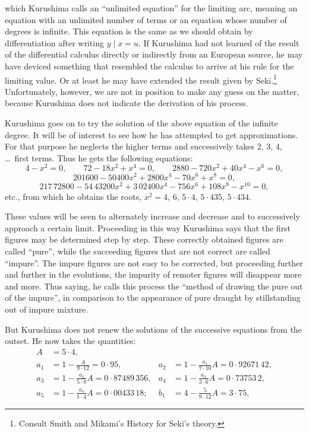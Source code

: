 \documentclass[11pt]{article}
\newcommand{\scanpage}[2]{\clearpage\setcounter{footnote}{0}\noindent{\footnotesize\color{gray}PDF page #1 · #2}\par\medskip}
\newcommand{\scanfooter}{}
\newcommand{\dd}{\mathbin{\cdot}}
\begin{document}
\scanpage{0234}{Chapter 30, printed page 220}
which Kurushima calls an ``unlimited equation'' for the limiting arc, meaning an equation with an unlimited number of terms or an equation whose number of degrees is infinite. This equation is the same as we should obtain by differentiation after writing $y\mid x=u$. If Kurushima had not learned of the result of the differential calculus directly or indirectly from an European source, he may have deviced something that resembled the calculus to arrive at his rule for the limiting value. Or at least he may have extended the result given by Seki.\footnote{Consult Smith and Mikami's History for Seki's theory.} Unfortunately, however, we are not in position to make any guess on the matter, because Kurushima does not indicate the derivation of his process.

Kurushima goes on to try the solution of the above equation of the infinite degree. It will be of interest to see how he has attempted to get approximations. For that purpose he neglects the higher terms and successively takes 2, 3, 4, \ldots\ first terms. Thus he gets the following equations:
\[
4-x^2=0,
\qquad 72-18x^2+x^4=0,
\qquad 2880-720x^2+40x^4-x^6=0,
\]
\[
201600-50400x^2+2800x^4-70x^6+x^8=0,
\]
\[
217\,72800-54\,43200x^2+3\,02400x^4-756x^6+108x^8-x^{10}=0,
\]
etc., from which he obtains the roots, $x^2=4$, $6$, $5\dd4$, $5\dd435$, $5\dd434$.

These values will be seen to alternately increase and decrease and to successively approach a certain limit. Proceeding in this way Kurushima says that the first figures may be determined step by step. These correctly obtained figures are called ``pure'', while the succeeding figures that are not correct are called ``impure''. The impure figures are not easy to be corrected, but proceeding further and further in the evolutions, the impurity of remoter figures will disappear more and more. Thus saying, he calls this process the ``method of drawing the pure out of the impure'', in comparison to the appearance of pure draught by stillstanding out of impure mixture.

But Kurushima does not renew the solutions of the successive equations from the outset. He now takes the quantities:
\[
\begin{aligned}
A&=5\dd4,\\
a_1&=1-\frac{A}{9\dd12}=0\dd95,
& a_2&=1-\frac{a_1}{7\dd10}A=0\dd92671\,42,\\
a_3&=1-\frac{a_2}{5\dd8}A=0\dd87489\,356,
& a_4&=1-\frac{a_3}{3\dd6}A=0\dd73753\,2,\\
a_5&=1-\frac{a_4}{1\dd4}A=0\dd00433\,18;
& b_1&=4-\frac5{9\dd12}A=3\dd75,
\end{aligned}
\]
\scanfooter
\end{document}
